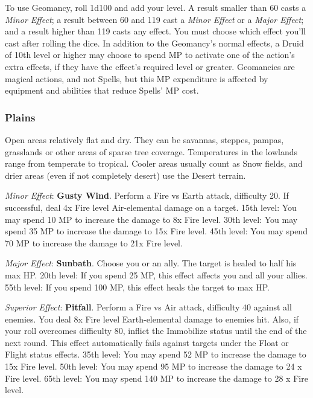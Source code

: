 To use Geomancy, roll 1d100 and add your level. A result smaller than 60 casts a \textit{Minor Effect}; a 
result between 60 and 119 cast a \textit{Minor Effect} or a \textit{Major Effect}; and a result higher than 119 casts any effect. 
You must choose which effect you'll cast after rolling the dice. In addition to the Geomancy’s normal 
effects, a Druid of 10th level or higher may choose to spend MP to activate one of the action’s extra effects, 
if they have the effect’s required level or greater. Geomancies are magical actions, and not Spells, but this 
MP expenditure is affected by equipment and abilities that reduce Spells’ MP cost.

\begin{multicols}{2}

	\subsubsection{Plains}
	
    Open areas relatively flat and dry. They can 
be savannas, steppes, pampas, grasslands or other
areas of sparse tree coverage. Temperatures in the 
lowlands range from temperate to tropical. Cooler 
areas usually count as Snow fields, and drier areas 
(even if not completely desert) use the Desert 
terrain.

    \textit{Minor Effect}: \textbf{Gusty Wind}. Perform a Fire 
vs Earth attack, difficulty 20. If successful, deal 4x 
Fire level Air-elemental damage on a target. 15th 
level: You may spend 10 MP to increase the 
damage to 8x Fire level. 30th level: You may spend 
35 MP to increase the damage to 15x Fire level. 
45th level: You may spend 70 MP to increase the 
damage to 21x Fire level.

\textit{Major Effect}: \textbf{Sunbath}. Choose you or an 
ally. The target is healed to half his max HP. 20th 
level: If you spend 25 MP, this effect affects you and 
all your allies. 55th level: If you spend 100 MP, this 
effect heals the target to max HP.

\textit{Superior Effect}: \textbf{Pitfall}. Perform a Fire vs 
Air attack, difficulty 40 against all enemies. You 
deal 8x Fire level Earth-elemental damage to 
enemies hit. Also, if your roll overcomes difficulty 
80, inflict the Immobilize status until the end of 
the next round. This effect automatically fails 
against targets under the Float or Flight status 
effects. 35th level: You may spend 52 MP to increase 
the damage to 15x Fire level. 50th level: You may 
spend 95 MP to increase the damage to 24 x Fire 
level. 65th level: You may spend 140 MP to increase 
the damage to 28 x Fire level.


\end{multicols}
